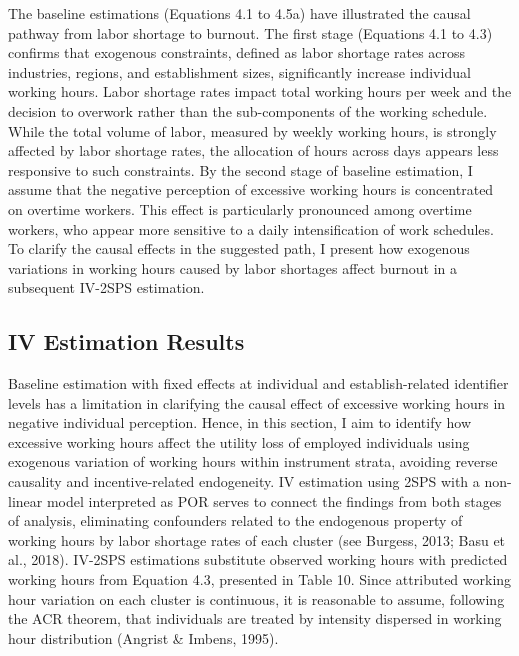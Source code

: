 \documentclass[
  12pt,
]{article}
\begin{document}
The baseline estimations (Equations 4.1 to 4.5a) have illustrated the
causal pathway from labor shortage to burnout. The first stage
(Equations 4.1 to 4.3) confirms that exogenous constraints, defined as
labor shortage rates across industries, regions, and establishment
sizes, significantly increase individual working hours. Labor shortage
rates impact total working hours per week and the decision to overwork
rather than the sub-components of the working schedule. While the total
volume of labor, measured by weekly working hours, is strongly affected
by labor shortage rates, the allocation of hours across days appears
less responsive to such constraints. By the second stage of baseline
estimation, I assume that the negative perception of excessive working
hours is concentrated on overtime workers. This effect is particularly
pronounced among overtime workers, who appear more sensitive to a daily
intensification of work schedules. To clarify the causal effects in the
suggested path, I present how exogenous variations in working hours
caused by labor shortages affect burnout in a subsequent IV-2SPS
estimation.

\subsection{IV Estimation Results}\label{iv-estimation-results}

Baseline estimation with fixed effects at individual and
establish-related identifier levels has a limitation in clarifying the
causal effect of excessive working hours in negative individual
perception. Hence, in this section, I aim to identify how excessive
working hours affect the utility loss of employed individuals using
exogenous variation of working hours within instrument strata, avoiding
reverse causality and incentive-related endogeneity. IV estimation using
2SPS with a non-linear model interpreted as POR serves to connect the
findings from both stages of analysis, eliminating confounders related
to the endogenous property of working hours by labor shortage rates of
each cluster (see Burgess, 2013; Basu et al., 2018). IV-2SPS estimations
substitute observed working hours with predicted working hours from
Equation 4.3, presented in Table 10. Since attributed working hour
variation on each cluster is continuous, it is reasonable to assume,
following the ACR theorem, that individuals are treated by intensity
dispersed in working hour distribution (Angrist \& Imbens, 1995).
\end{document}
